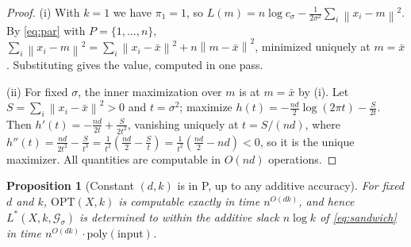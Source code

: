 \documentclass{amsart}
\theoremstyle{plain}
\newtheorem{proposition}{Proposition}
\theoremstyle{definition}
\newcommand{\norm}[1]{\left\lVert #1 \right\rVert}
\begin{document}
\begin{proof}
(i) With $k=1$ we have $\pi_{1}=1$, so
$L(m)=n\log c_{\sigma}-\frac{1}{2\sigma^{2}}\sum_{i}\norm{x_{i}-m}^{2}$. By
\eqref{eq:par} with $P=\{1,\dots,n\}$, $\sum_{i}\norm{x_{i}-m}^{2}
=\sum_{i}\norm{x_{i}-\bar x}^{2}+n\norm{m-\bar x}^{2}$, minimized uniquely at
$m=\bar x$. Substituting gives the value, computed in one pass.

(ii) For fixed $\sigma$, the inner maximization over $m$ is at $m=\bar x$ by (i).
Let $S=\sum_{i}\norm{x_{i}-\bar x}^{2}>0$ and $t=\sigma^{2}$; maximize
$h(t)=-\tfrac{nd}{2}\log(2\pi t)-\tfrac{S}{2t}$. Then
$h'(t)=-\tfrac{nd}{2t}+\tfrac{S}{2t^{2}}$, vanishing uniquely at $t=S/(nd)$, where
$h''(t)=\tfrac{nd}{2t^{2}}-\tfrac{S}{t^{3}}=\tfrac{1}{t^{2}}(\tfrac{nd}{2}-\tfrac{S}{t})
=\tfrac{1}{t^{2}}(\tfrac{nd}{2}-nd)<0$, so it is the unique maximizer. All
quantities are computable in $O(nd)$ operations.
\end{proof}

\begin{proposition}[Constant $(d,k)$ is in P, up to any additive accuracy]\label{prop:dk}
For fixed $d$ and $k$, $\mathrm{OPT}(X,k)$ is computable exactly in time
$n^{O(dk)}$, and hence $L^{\ast}(X,k,\mathcal G_{\sigma})$ is determined to within
the additive slack $n\log k$ of \eqref{eq:sandwich} in time $n^{O(dk)}\cdot
\mathrm{poly}(\text{input})$.
\end{proposition}
\end{document}
